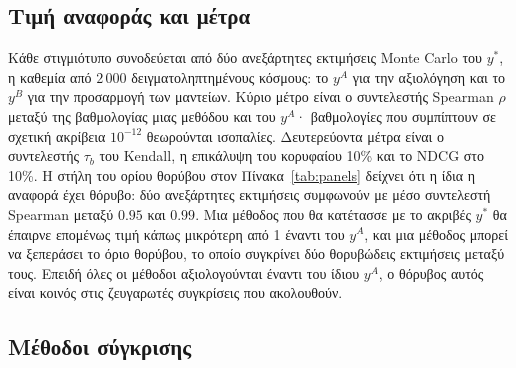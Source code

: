 \documentclass[11pt,a4paper]{article}
\begin{document}
\begin{table}[H]
\centering\small
\caption{Σύνολα στιγμιοτύπων. Το «όριο θορύβου» είναι ο μέσος συντελεστής Spearman μεταξύ των δύο ανεξάρτητων δειγμάτων της τιμής αναφοράς, μέτρο του θορύβου της αναφοράς.}\label{tab:panels}
\end{table}

\subsection{Τιμή αναφοράς και μέτρα}

Κάθε στιγμιότυπο συνοδεύεται από δύο ανεξάρτητες εκτιμήσεις Monte Carlo του $y^*$, η καθεμία από $2\,000$ δειγματοληπτημένους κόσμους: το $y^A$ για την αξιολόγηση και το $y^B$ για την προσαρμογή των μαντείων. Κύριο μέτρο είναι ο συντελεστής Spearman $\rho$ μεταξύ της βαθμολογίας μιας μεθόδου και του $y^A$· βαθμολογίες που συμπίπτουν σε σχετική ακρίβεια $10^{-12}$ θεωρούνται ισοπαλίες. Δευτερεύοντα μέτρα είναι ο συντελεστής $\tau_b$ του Kendall, η επικάλυψη του κορυφαίου 10\% και το NDCG στο 10\%. Η στήλη του ορίου θορύβου στον Πίνακα~\ref{tab:panels} δείχνει ότι η ίδια η αναφορά έχει θόρυβο: δύο ανεξάρτητες εκτιμήσεις συμφωνούν με μέσο συντελεστή Spearman μεταξύ $0.95$ και $0.99$. Μια μέθοδος που θα κατέτασσε με το ακριβές $y^*$ θα έπαιρνε επομένως τιμή κάπως μικρότερη από 1 έναντι του $y^A$, και μια μέθοδος μπορεί να ξεπεράσει το όριο θορύβου, το οποίο συγκρίνει δύο θορυβώδεις εκτιμήσεις μεταξύ τους. Επειδή όλες οι μέθοδοι αξιολογούνται έναντι του ίδιου $y^A$, ο θόρυβος αυτός είναι κοινός στις ζευγαρωτές συγκρίσεις που ακολουθούν.

\subsection{Μέθοδοι σύγκρισης}
\end{document}
